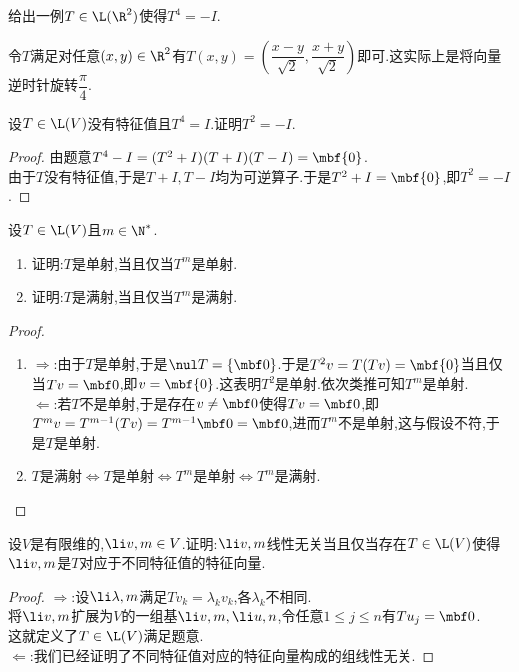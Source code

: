 \documentclass{ctexart}
\begin{document}
\begin{problem}[31.]
    给出一例$T\in\L(\R^2)$使得$T^4=-I$.
\end{problem}
\begin{solution}[Solution.]
    令$T$满足对任意$(x,y)\in\R^2$有$T(x,y)=\left(\dfrac{x-y}{\sqrt{2}},\dfrac{x+y}{\sqrt{2}}\right)$即可.这实际上是将向量逆时针旋转$\dfrac{\pi}{4}$.
\end{solution}
\begin{problem}[32.]
    设$T\in\L(V)$没有特征值且$T^4=I$.证明$T^2=-I$.
\end{problem}
\begin{proof}
    由题意$T^4-I=(T^2+I)(T+I)(T-I)=\mbf{0}$.\\
    由于$T$没有特征值,于是$T+I,T-I$均为可逆算子.于是$T^2+I=\mbf{0}$,即$T^2=-I$.
\end{proof}
\begin{problem}[33.]
    设$T\in\L(V)$且$m\in\N^*$.
    \begin{enumerate}[label=\tbf{(\arabic*)}]
        \item 证明:$T$是单射,当且仅当$T^m$是单射.
        \item 证明:$T$是满射,当且仅当$T^m$是满射.
    \end{enumerate}
\end{problem}
\begin{proof}
    \begin{enumerate}[label=\tbf{(\arabic*)}]
        \item $\Rightarrow$:由于$T$是单射,于是$\nul T=\{\mbf0\}$.于是$T^2v=T(Tv)=\mbf{0}$当且仅当$Tv=\mbf0$,即$v=\mbf{0}$.这表明$T^2$是单射.依次类推可知$T^m$是单射.\\
            $\Leftarrow$:若$T$不是单射,于是存在$v\neq\mbf0$使得$Tv=\mbf0$,即$T^mv=T^{m-1}(Tv)=T^{m-1}\mbf0=\mbf0$,进而$T^m$不是单射,这与假设不符,于是$T$是单射.
        \item $T\text{是满射}\Leftrightarrow T\text{是单射}\Leftrightarrow T^m\text{是单射}\Leftrightarrow T^m\text{是满射}$.
    \end{enumerate}
\end{proof}
\begin{problem}[34.]
    设$V$是有限维的,$\li v,m\in V$.证明:$\li v,m$线性无关当且仅当存在$T\in\L(V)$使得$\li v,m$是$T$对应于不同特征值的特征向量.
\end{problem}
\begin{proof}
    $\Rightarrow$:设$\li\lambda,m$满足$Tv_k=\lambda_kv_k$,各$\lambda_k$不相同.\\
    将$\li v,m$扩展为$V$的一组基$\li v,m,\li u,n$,令任意$1\leqslant j\leqslant n$有$Tu_j=\mbf0$.\\
    这就定义了$T\in\L(V)$满足题意.\\
    $\Leftarrow$:我们已经证明了不同特征值对应的特征向量构成的组线性无关.
\end{proof}
\end{document}
